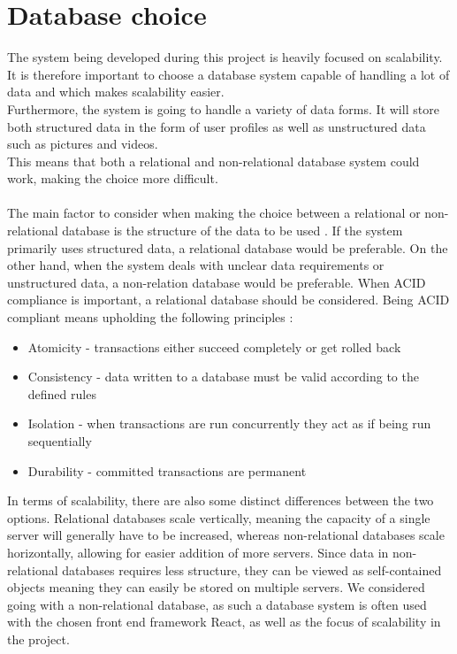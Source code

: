 \section{Database choice}
The system being developed during this project is heavily focused on scalability.
It is therefore important to choose a database system capable of handling a lot of data and which makes scalability easier.
\\
Furthermore, the system is going to handle a variety of data forms. It will store both structured data in the form of user profiles as well as unstructured data such as pictures and videos.
\\
This means that both a relational and non-relational database system could work, making the choice more difficult.
\\\\
The main factor to consider when making the choice between a relational or non-relational database is the structure of the data to be used \cite{sqlvsnosql}.
If the system primarily uses structured data, a relational database would be preferable.
On the other hand, when the system deals with unclear data requirements or unstructured data, a non-relation database would be preferable. 
When ACID compliance is important, a relational database should be considered.
Being ACID compliant means upholding the following principles \cite{sqlvsnosql}:
\begin{itemize}
    \item Atomicity - transactions either succeed completely or get rolled back
    \item Consistency - data written to a database must be valid according to the defined rules
    \item Isolation - when transactions are run concurrently they act as if being run sequentially
    \item Durability - committed transactions are permanent 
\end{itemize}
In terms of scalability, there are also some distinct differences between the two options. 
Relational databases scale vertically, meaning the capacity of a single server will generally have to be increased, whereas non-relational databases scale horizontally, allowing for easier addition of more servers.
Since data in non-relational databases requires less structure, they can be viewed as self-contained objects meaning they can easily be stored on multiple servers.
We considered going with a non-relational database, as such a database system is often used with the chosen front end framework React, as well as the focus of scalability in the project.

